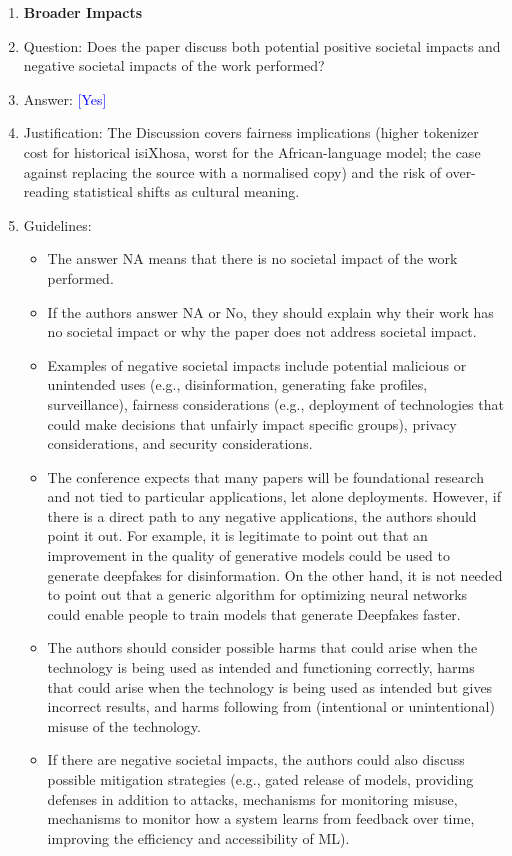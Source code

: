 \documentclass[10pt,letterpaper]{article}
\newcommand{\answerYes}[1][]{\textcolor{blue}{[Yes] #1}}
\begin{document}
\begin{enumerate}
\item {\bf Broader Impacts}
    \item[] Question: Does the paper discuss both potential positive societal impacts and negative societal impacts of the work performed?
    \item[] Answer: \answerYes{}
    \item[] Justification: The Discussion covers fairness implications (higher tokenizer cost for historical isiXhosa, worst for the African-language model; the case against replacing the source with a normalised copy) and the risk of over-reading statistical shifts as cultural meaning.
    \item[] Guidelines:
    \begin{itemize}
        \item The answer NA means that there is no societal impact of the work performed.
        \item If the authors answer NA or No, they should explain why their work has no societal impact or why the paper does not address societal impact.
        \item Examples of negative societal impacts include potential malicious or unintended uses (e.g., disinformation, generating fake profiles, surveillance), fairness considerations (e.g., deployment of technologies that could make decisions that unfairly impact specific groups), privacy considerations, and security considerations.
        \item The conference expects that many papers will be foundational research and not tied to particular applications, let alone deployments. However, if there is a direct path to any negative applications, the authors should point it out. For example, it is legitimate to point out that an improvement in the quality of generative models could be used to generate deepfakes for disinformation. On the other hand, it is not needed to point out that a generic algorithm for optimizing neural networks could enable people to train models that generate Deepfakes faster.
        \item The authors should consider possible harms that could arise when the technology is being used as intended and functioning correctly, harms that could arise when the technology is being used as intended but gives incorrect results, and harms following from (intentional or unintentional) misuse of the technology.
        \item If there are negative societal impacts, the authors could also discuss possible mitigation strategies (e.g., gated release of models, providing defenses in addition to attacks, mechanisms for monitoring misuse, mechanisms to monitor how a system learns from feedback over time, improving the efficiency and accessibility of ML).
    \end{itemize}
    

\end{enumerate}
\end{document}
